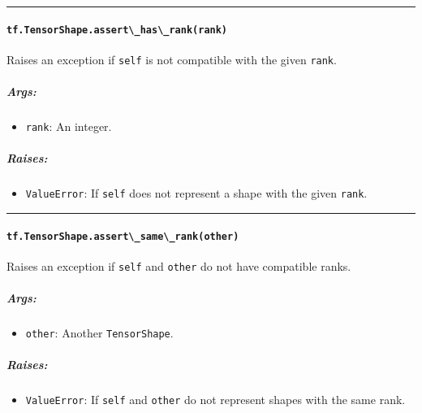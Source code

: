 \begin{center}\rule{0.5\linewidth}{\linethickness}\end{center}

\paragraph{\texorpdfstring{\lstinline{tf.TensorShape.assert\_has\_rank(rank)}
}{tf.TensorShape.assert\_has\_rank(rank) }}\label{tf.tensorshape.assertux5fhasux5frankrank}

Raises an exception if \lstinline{self} is not compatible with the given
\lstinline{rank}.

\subparagraph{Args: }\label{args-36}

\begin{itemize}
\tightlist
\item
  \lstinline{rank}: An integer.
\end{itemize}

\subparagraph{Raises: }\label{raises-21}

\begin{itemize}
\tightlist
\item
  \lstinline{ValueError}: If \lstinline{self} does not represent a shape with
  the given \lstinline{rank}.
\end{itemize}

\begin{center}\rule{0.5\linewidth}{\linethickness}\end{center}

\paragraph{\texorpdfstring{\lstinline{tf.TensorShape.assert\_same\_rank(other)}
}{tf.TensorShape.assert\_same\_rank(other) }}\label{tf.tensorshape.assertux5fsameux5frankother}

Raises an exception if \lstinline{self} and \lstinline{other} do not have
compatible ranks.

\subparagraph{Args: }\label{args-37}

\begin{itemize}
\tightlist
\item
  \lstinline{other}: Another \lstinline{TensorShape}.
\end{itemize}

\subparagraph{Raises: }\label{raises-22}

\begin{itemize}
\tightlist
\item
  \lstinline{ValueError}: If \lstinline{self} and \lstinline{other} do not
  represent shapes with the same rank.
\end{itemize}

